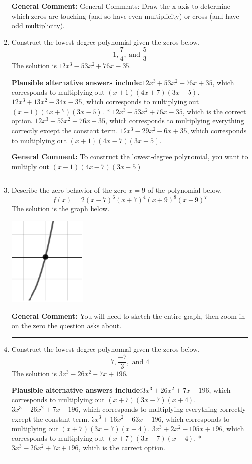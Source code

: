 \documentclass{extbook}[14pt]
\newcommand{\litem}[1]{\item #1

\rule{\textwidth}{0.4pt}}
\begin{document}
\begin{enumerate}
{\textbf{General Comment:} General Comments: Draw the x-axis to determine which zeros are touching (and so have even multiplicity) or cross (and have odd multiplicity).
}
\litem{
Construct the lowest-degree polynomial given the zeros below.
\[ 1, \frac{7}{4}, \text{ and } \frac{5}{3} \]The solution is \( 12x^{3} -53 x^{2} +76 x -35 \).\begin{enumerate}[label=\Alph*.]
\textbf{Plausible alternative answers include:}$12x^{3} +53 x^{2} +76 x + 35$, which corresponds to multiplying out $(x + 1)(4x + 7)(3x + 5)$.
$12x^{3} +13 x^{2} -34 x -35$, which corresponds to multiplying out $(x + 1)(4x + 7)(3x -5)$.
* $12x^{3} -53 x^{2} +76 x -35$, which is the correct option.
$12x^{3} -53 x^{2} +76 x + 35$, which corresponds to multiplying everything correctly except the constant term.
$12x^{3} -29 x^{2} -6 x + 35$, which corresponds to multiplying out $(x + 1)(4x -7)(3x -5)$.
\end{enumerate}

\textbf{General Comment:} To construct the lowest-degree polynomial, you want to multiply out $(x -1)(4x -7)(3x -5)$
}
\litem{
Describe the zero behavior of the zero $x = 9$ of the polynomial below.
\[ f(x) = 2(x - 7)^{6}(x + 7)^{4}(x + 9)^{8}(x - 9)^{7} \]The solution is the graph below.
    \begin{center}
        \includegraphics[width=0.3\textwidth]{../Figures/polyZeroBehaviorCopyDC.png}
    \end{center}

\textbf{General Comment:} You will need to sketch the entire graph, then zoom in on the zero the question asks about.
}
\litem{
Construct the lowest-degree polynomial given the zeros below.
\[ 7, \frac{-7}{3}, \text{ and } 4 \]The solution is \( 3x^{3} -26 x^{2} +7 x + 196 \).\begin{enumerate}[label=\Alph*.]
\textbf{Plausible alternative answers include:}$3x^{3} +26 x^{2} +7 x -196$, which corresponds to multiplying out $(x + 7)(3x -7)(x + 4)$.
$3x^{3} -26 x^{2} +7 x -196$, which corresponds to multiplying everything correctly except the constant term.
$3x^{3} +16 x^{2} -63 x -196$, which corresponds to multiplying out $(x + 7)(3x + 7)(x -4)$.
$3x^{3} +2 x^{2} -105 x + 196$, which corresponds to multiplying out $(x + 7)(3x -7)(x -4)$.
* $3x^{3} -26 x^{2} +7 x + 196$, which is the correct option.
\end{enumerate}

}
\end{enumerate}
\end{document}
